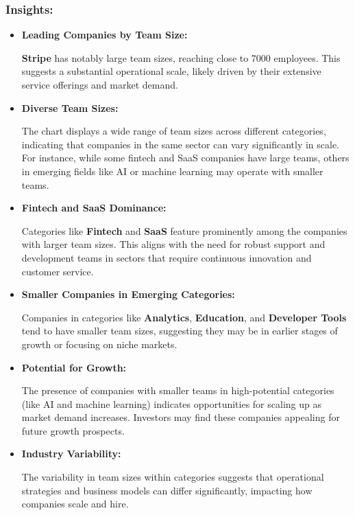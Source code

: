\documentclass[a4paper,12pt]{article}
\begin{document}
\subsubsection*{Insights:}

\begin{itemize}
\item \textbf{Leading Companies by Team Size:}

\textbf{Stripe} has notably large team sizes, reaching close to 7000 employees. This suggests a substantial operational scale, likely driven by their extensive service offerings and market demand.

\item \textbf{Diverse Team Sizes:}

The chart displays a wide range of team sizes across different categories, indicating that companies in the same sector can vary significantly in scale. For instance, while some fintech and SaaS companies have large teams, others in emerging fields like AI or machine learning may operate with smaller teams.

\item \textbf{Fintech and SaaS Dominance:}

Categories like  \textbf{Fintech} and \textbf{SaaS} feature prominently among the companies with larger team sizes. This aligns with the need for robust support and development teams in sectors that require continuous innovation and customer service.

\item \textbf{Smaller Companies in Emerging Categories:}

Companies in categories like \textbf{Analytics}, \textbf{Education}, and \textbf{Developer Tools} tend to have smaller team sizes, suggesting they may be in earlier stages of growth or focusing on niche markets.

\item \textbf{Potential for Growth:}

The presence of companies with smaller teams in high-potential categories (like AI and machine learning) indicates opportunities for scaling up as market demand increases. Investors may find these companies appealing for future growth prospects.

\item \textbf{Industry Variability:}

The variability in team sizes within categories suggests that operational strategies and business models can differ significantly, impacting how companies scale and hire.
\end{itemize}
\end{document}
